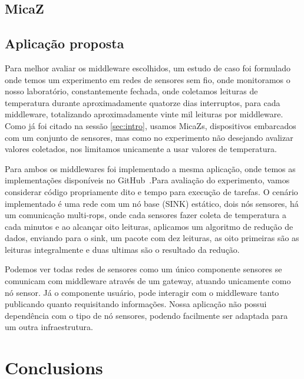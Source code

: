 \documentclass[12pt]{article}
\begin{document}
\subsection{MicaZ}

\subsection{Aplicação proposta}

Para melhor avaliar os middleware escolhidos, um estudo de caso foi formulado onde temos um experimento em redes de sensores sem fio, onde monitoramos o nosso laboratório, constantemente fechada, onde coletamos leituras de temperatura durante aproximadamente quatorze dias interruptos, para cada middleware, totalizando aproximadamente vinte mil leituras por middleware. Como já foi citado na sessão \ref{sec:intro}, usamos MicaZs, dispositivos embarcados com um conjunto de sensores, mas como no experimento não desejando avalizar valores coletados, nos limitamos unicamente a usar valores de temperatura.


Para ambos os middlewares foi implementado a mesma aplicação, onde temos as implementações disponíveis no GitHub~\cite{jcl-app}.Para avaliação do experimento, vamos considerar código propriamente dito e tempo para execução de tarefas. O cenário implementado é uma rede com um nó base (SINK) estático, dois nós sensores, há um comunicação multi-rops, onde cada sensores fazer coleta de temperatura a cada minutos e ao alcançar oito leituras, aplicamos um algoritmo de redução de dados, enviando para o sink, um pacote com dez leituras, as oito primeiras são as leituras integralmente e duas ultimas são o resultado da redução.

Podemos ver todas redes de sensores como um único componente sensores se comunicam com middleware através de um gateway, atuando unicamente como nó sensor. Já o componente usuário, pode interagir com o middleware tanto publicando quanto requisitando informações. Nossa aplicação não possui dependência com o tipo de nó sensores, podendo facilmente ser adaptada para um outra infraestrutura.

\section{Conclusions}
\end{document}
